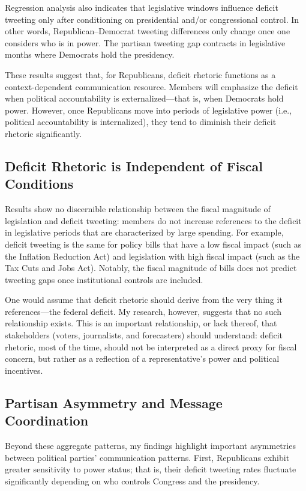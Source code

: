 \documentclass[
  12pt,
]{article}
\begin{document}
Regression analysis also indicates that legislative windows influence
deficit tweeting only after conditioning on presidential and/or
congressional control. In other words, Republican--Democrat tweeting
differences only change once one considers who is in power. The partisan
tweeting gap contracts in legislative months where Democrats hold the
presidency.

These results suggest that, for Republicans, deficit rhetoric functions
as a context-dependent communication resource. Members will emphasize
the deficit when political accountability is externalized---that is,
when Democrats hold power. However, once Republicans move into periods
of legislative power (i.e., political accountability is internalized),
they tend to diminish their deficit rhetoric significantly.

\subsection{Deficit Rhetoric is Independent of Fiscal
Conditions}\label{deficit-rhetoric-is-independent-of-fiscal-conditions}

Results show no discernible relationship between the fiscal magnitude of
legislation and deficit tweeting: members do not increase references to
the deficit in legislative periods that are characterized by large
spending. For example, deficit tweeting is the same for policy bills
that have a low fiscal impact (such as the Inflation Reduction Act) and
legislation with high fiscal impact (such as the Tax Cuts and Jobs Act).
Notably, the fiscal magnitude of bills does not predict tweeting gaps
once institutional controls are included.

One would assume that deficit rhetoric should derive from the very thing
it references---the federal deficit. My research, however, suggests that
no such relationship exists. This is an important relationship, or lack
thereof, that stakeholders (voters, journalists, and forecasters) should
understand: deficit rhetoric, most of the time, should not be
interpreted as a direct proxy for fiscal concern, but rather as a
reflection of a representative's power and political incentives.

\subsection{Partisan Asymmetry and Message
Coordination}\label{partisan-asymmetry-and-message-coordination}

Beyond these aggregate patterns, my findings highlight important
asymmetries between political parties' communication patterns. First,
Republicans exhibit greater sensitivity to power status; that is, their
deficit tweeting rates fluctuate significantly depending on who controls
Congress and the presidency.
\end{document}
